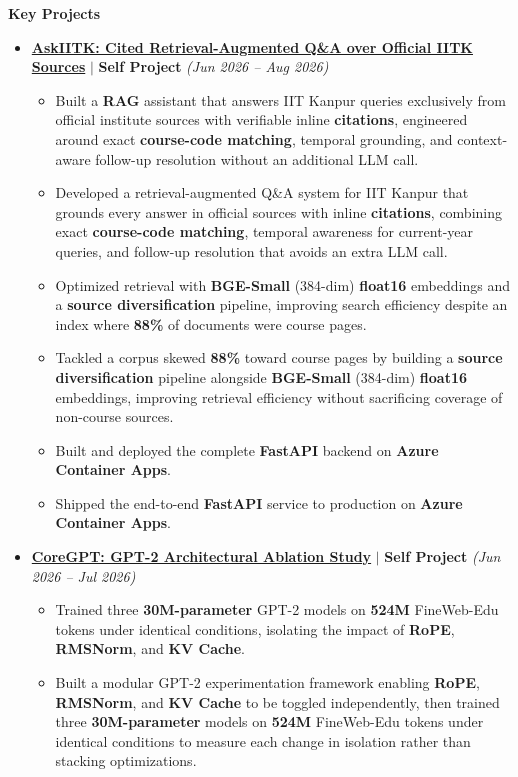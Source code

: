 \documentclass[10pt]{extarticle}
\newcommand{\sectionheader}[1]{
    \vspace{3pt}
    \begin{tcolorbox}
        \textbf{\large #1}
    \end{tcolorbox}
    \vspace{2pt}
}
\begin{document}
\sectionheader{Key Projects}
\begin{itemize}[itemsep=7pt]
    \item \textbf{\href{https://github.com/cjaitej/Ask-IITK}{AskIITK: Cited Retrieval-Augmented Q\&A over Official IITK Sources}} $|$ \textbf{Self Project} \hfill \textit{(Jun 2026 -- Aug 2026)}
    \begin{itemize}
        \item Built a \textbf{RAG} assistant that answers IIT Kanpur queries exclusively from official institute sources with verifiable inline \textbf{citations}, engineered around exact \textbf{course-code matching}, temporal grounding, and context-aware follow-up resolution without an additional LLM call.
        \item Developed a retrieval-augmented Q\&A system for IIT Kanpur that grounds every answer in official sources with inline \textbf{citations}, combining exact \textbf{course-code matching}, temporal awareness for current-year queries, and follow-up resolution that avoids an extra LLM call.
        \item Optimized retrieval with \textbf{BGE-Small} (384-dim) \textbf{float16} embeddings and a \textbf{source diversification} pipeline, improving search efficiency despite an index where \textbf{88\%} of documents were course pages.
        \item Tackled a corpus skewed \textbf{88\%} toward course pages by building a \textbf{source diversification} pipeline alongside \textbf{BGE-Small} (384-dim) \textbf{float16} embeddings, improving retrieval efficiency without sacrificing coverage of non-course sources.
        \item Built and deployed the complete \textbf{FastAPI} backend on \textbf{Azure Container Apps}.
        \item Shipped the end-to-end \textbf{FastAPI} service to production on \textbf{Azure Container Apps}.
    \end{itemize}
    \item \textbf{\href{https://github.com/cjaitej/CoreGPT}{CoreGPT: GPT-2 Architectural Ablation Study}} $|$ \textbf{Self Project} \hfill \textit{(Jun 2026 -- Jul 2026)}
    \begin{itemize}
        \item Trained three \textbf{30M-parameter} GPT-2 models on \textbf{524M} FineWeb-Edu tokens under identical conditions, isolating the impact of \textbf{RoPE}, \textbf{RMSNorm}, and \textbf{KV Cache}.
        \item Built a modular GPT-2 experimentation framework enabling \textbf{RoPE}, \textbf{RMSNorm}, and \textbf{KV Cache} to be toggled independently, then trained three \textbf{30M-parameter} models on \textbf{524M} FineWeb-Edu tokens under identical conditions to measure each change in isolation rather than stacking optimizations.

\end{itemize}
\end{itemize}
\end{document}

